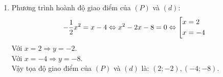 \begin{ex}
{\begin{enumerate}
\begin{itemize}
\begin{center}
		\end{center}
		\end{itemize}
	\item  Phương trình hoành độ giao điểm của $(P)$ và $(d):$
	$$-\dfrac{1}{2} x^2=x-4\Leftrightarrow x^2-2x-8=0\Leftrightarrow \left[\begin{aligned}&x=2\\&x=-4\end{aligned}\right.$$
	Với $x=2\Rightarrow y=-2.$\\
	Với $x=-4\Rightarrow y=-8.$\\
	Vậy tọa độ giao điểm của $(P)$ và $(d)$ là: $(2;-2),(-4;-8).$
	\end{enumerate}
}
	\end{ex}
